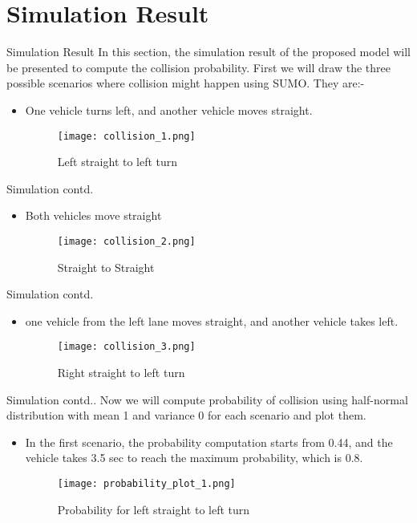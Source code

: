 \documentclass{beamer}
\begin{document}
\section{Simulation Result}
\begin{frame}{Simulation Result}
    In this section, the simulation result of the proposed model will be presented to compute the collision probability. First we will draw the three possible scenarios where collision might happen using SUMO. They are:-
    \begin{itemize}
        \item One vehicle turns left, and another vehicle moves straight.
        \begin{figure}
            \centering
            \texttt{[image: collision\_1.png]}
            \caption{ Left straight to left turn}
            \label{collision_1}
        \end{figure}
    \end{itemize}
\end{frame}
\begin{frame}{Simulation contd.}
    \begin{itemize}
        \item Both vehicles move straight
        \begin{figure}
            \centering
            \texttt{[image: collision\_2.png]}
            \caption{ Straight to Straight}
            \label{collision_2}
        \end{figure}
    \end{itemize}
\end{frame}
\begin{frame}{Simulation contd.}
    \begin{itemize}
        \item one vehicle  from the left lane moves straight, and another vehicle takes left.
        \begin{figure}
            \centering
            \texttt{[image: collision\_3.png]}
            \caption{Right straight to left turn}
            \label{collision_2}
        \end{figure}
    \end{itemize}
\end{frame}
\begin{frame}{Simulation contd..}
   Now we will compute probability of collision using half-normal distribution with mean 1 and variance 0 for each scenario and plot them.
   \begin{itemize}
       \item In the first scenario, the probability computation starts from 0.44,  and the vehicle takes 3.5 sec to reach the maximum probability, which is 0.8.
       \begin{figure}
            \centering
            \texttt{[image: probability\_plot\_1.png]}
            \caption{Probability for left straight to left turn}
            \label{probability_plot_1}
        \end{figure}
   \end{itemize}
\end{frame}
\end{document}
